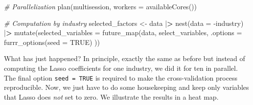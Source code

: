 \documentclass[
]{book}
\newenvironment{Shaded}{\begin{snugshade}}{\end{snugshade}}
\newcommand{\AttributeTok}[1]{\textcolor[rgb]{0.61,0.61,0.61}{#1}}
\newcommand{\CommentTok}[1]{\textcolor[rgb]{0.37,0.37,0.37}{\textit{#1}}}
\newcommand{\ConstantTok}[1]{\textcolor[rgb]{0,0,0}{#1}}
\newcommand{\ErrorTok}[1]{\textcolor[rgb]{0.14,0.14,0.14}{\textbf{#1}}}
\newcommand{\FunctionTok}[1]{\textcolor[rgb]{0,0,0}{#1}}
\newcommand{\NormalTok}[1]{#1}
\newcommand{\OtherTok}[1]{\textcolor[rgb]{0.37,0.37,0.37}{#1}}
\newcommand{\SpecialCharTok}[1]{\textcolor[rgb]{0,0,0}{#1}}
\begin{document}
\begin{Shaded}
\begin{Highlighting}[]
\CommentTok{\# Parallelization}
\FunctionTok{plan}\NormalTok{(multisession, }\AttributeTok{workers =} \FunctionTok{availableCores}\NormalTok{())}

\CommentTok{\# Computation by industry}
\NormalTok{selected\_factors }\OtherTok{\textless{}{-}}\NormalTok{ data }\SpecialCharTok{|}\ErrorTok{\textgreater{}}
  \FunctionTok{nest}\NormalTok{(}\AttributeTok{data =} \SpecialCharTok{{-}}\NormalTok{industry) }\SpecialCharTok{|}\ErrorTok{\textgreater{}}
  \FunctionTok{mutate}\NormalTok{(}\AttributeTok{selected\_variables =} \FunctionTok{future\_map}\NormalTok{(data, select\_variables,}
    \AttributeTok{.options =} \FunctionTok{furrr\_options}\NormalTok{(}\AttributeTok{seed =} \ConstantTok{TRUE}\NormalTok{)}
\NormalTok{  ))}
\end{Highlighting}
\end{Shaded}

What has just happened? In principle, exactly the same as before but instead of computing the Lasso coefficients for one industry, we did it for ten in parallel. The final option \texttt{seed\ =\ TRUE} is required to make the cross-validation process reproducible.
Now, we just have to do some housekeeping and keep only variables that Lasso does \emph{not} set to zero. We illustrate the results in a heat map.
\end{document}
